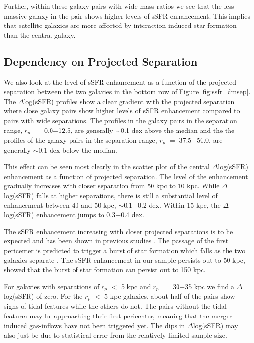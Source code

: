 \documentclass[iop,revtex4,twocolumn,apj,numberedappendix,appendixfloats]{emulateapj}
\begin{document}
Further, within these galaxy pairs with wide mass ratios we see that the less massive galaxy in the pair shows higher levels of sSFR enhancement. This implies that satellite galaxies are more affected by interaction induced star formation than the central galaxy. 

\subsection{Dependency on Projected Separation}\label{sec:sep}

We also look at the level of sSFR enhancement as a function of the projected separation between the two galaxies in the bottom row of Figure \ref{fig:ssfr_dmsep}. The $\Delta$log(sSFR) profiles show a clear gradient with the projected separation where close galaxy pairs show higher levels of sSFR enhancement compared to pairs with wide separations. The profiles in the galaxy pairs in the separation range, $r_p$ $=$ 0.0$-$12.5, are generally $\sim$0.1 dex above the median and the the profiles of the galaxy pairs in the separation range, $r_p$ $=$ 37.5$-$50.0, are generally $\sim$0.1 dex below the median. 

This effect can be seen most clearly in the scatter plot of the central $\Delta$log(sSFR) enhancement as a function of projected separation. The level of the enhancement gradually increases with closer separation from 50 kpc to 10 kpc. While $\Delta$log(sSFR) falls at higher separations, there is still a substantial level of enhancement between 40 and 50 kpc, $\sim$0.1$-$0.2 dex. Within 15 kpc, the $\Delta$log(sSFR) enhancement jumps to 0.3$-$0.4 dex. 

The sSFR enhancement increasing with closer projected separations is to be expected and has been shown in previous studies \citep{Li:2008, Ellison:2008, Scudder:2012, Patton:2013}. The passage of the first pericenter is predicted to trigger a burst of star formation which falls as the two galaxies separate \citep{Scudder:2012}. The sSFR enhancement in our sample persists out to 50 kpc, \citet{Patton:2013} showed that the burst of star formation can persist out to 150 kpc. 

For galaxies with separations of $r_p$ $<$ 5 kpc and $r_p$ $=$ 30$-$35 kpc we find a $\Delta$log(sSFR) of zero. For the $r_p$ $<$ 5 kpc galaxies, about half of the pairs show signs of tidal features while the others do not. The pairs without the tidal features may be approaching their first pericenter, meaning that the merger-induced gas-inflows have not been triggered yet. The dips in $\Delta$log(sSFR) may also just be due to statistical error from the relatively limited sample size.  
\end{document}
